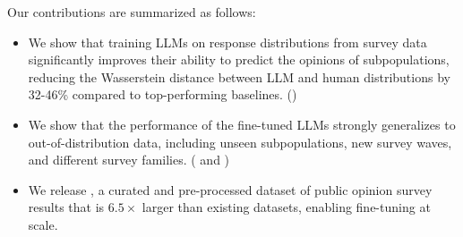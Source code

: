 Our contributions are summarized as follows:
\vspace{-3mm}
\begin{itemize}[leftmargin=3.3mm]
\setlength\itemsep{2pt}

\item We show that training LLMs on response distributions from survey data significantly improves their ability to predict the opinions of subpopulations, reducing the Wasserstein distance between LLM and human distributions by 32-46\% compared to top-performing baselines. ()
\vspace{-1mm}
\item We show that the performance of the fine-tuned LLMs strongly generalizes to out-of-distribution data, including unseen subpopulations, new survey waves, and different survey families. 
( and )
\vspace{-1mm}
\item We release \OURDATA, a curated and pre-processed dataset of public opinion survey results that is $6.5\times$ larger than existing datasets, enabling fine-tuning at scale.
\end{itemize}